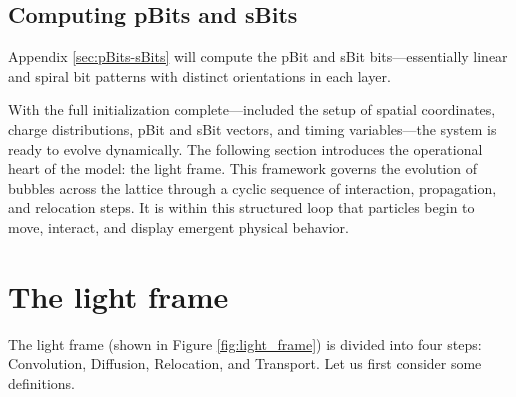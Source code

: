 \documentclass[12pt,english]{article}
\begin{document}
\subsection{Computing pBits and sBits}
Appendix \ref{sec:pBits-sBits} will compute the pBit and sBit bits—essentially linear and spiral bit patterns with distinct orientations in each layer.

With the full initialization complete—included the setup of spatial coordinates, charge distributions, pBit and sBit vectors, and timing variables—the system is ready to evolve dynamically. The following section introduces the operational heart of the model: the light frame. This framework governs the evolution of bubbles across the lattice through a cyclic sequence of interaction, propagation, and relocation steps. It is within this structured loop that particles begin to move, interact, and display emergent physical behavior.


\section{The light frame}\label{sec:light-frame}

The light frame (shown in Figure \ref{fig:light_frame}) is divided into four steps: Convolution, Diffusion, Relocation, and Transport. Let us first consider some definitions.
\end{document}

